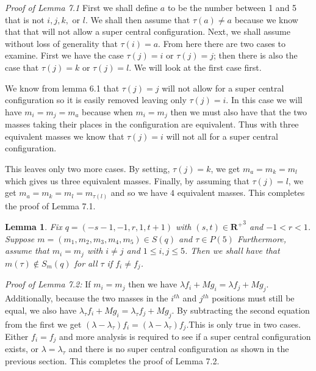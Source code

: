 \documentclass[11pt,leqno]{article}
\newtheorem{lemma}[theorem]{Lemma}
\theoremstyle{definition}
\theoremstyle{remark}
\numberwithin{equation}{section}
\begin{document}
\textit{Proof of Lemma 7.1}
First we shall define $a$ to be the number between 1 and 5 that is not $i,j,k,$ or $l$. We shall then assume that $\tau(a)\neq a$ because we know that that will not allow a super central configuration. Next, we shall assume without loss of generality that $\tau(i)=a$. From here there are two cases to examine. First we have the case $\tau(j)=i$ or $\tau(j)=j$; then there is also the case that $\tau(j)=k$ or $\tau(j)=l$. We will look at the first case first. 

We know from lemma 6.1 that $\tau(j)=j$ will not allow for a super central configuration so it is easily removed leaving only $\tau(j)=i$. In this case we will have $m_i=m_j=m_a$ because when $m_i=m_j$ then we must also have that the two masses taking their places in the configuration are equivalent. Thus with three equivalent masses we know that $\tau(j)=i$ will not all for a super central configuration.

This leaves only two more cases. By setting, $\tau(j)=k$, we get $m_a=m_k=m_l$ which gives us three equivalent masses. Finally, by assuming that $\tau(j)=l$, we get $m_a=m_k=m_l=m_{\tau(l)}$ and so we have $4$ equivalent masses. This completes the proof of Lemma 7.1.

\begin{lemma}
Fix $q=(-s-1, -1, r, 1, t+1)$ with $(s,t)\in \mathbf{R^+}^3$ and $-1<r<1$. Suppose $m=(m_1, m_2, m_3, m_4, m_5)\in S(q)$ and $\tau \in P(5)$ Furthermore, assume that $m_i=m_j$ with $i\neq j$ and $1\leq i,j \leq 5$. Then we shall have that $m(\tau) \notin S_m(q)$ for all $\tau$ if $f_i \neq f_j$.
\end{lemma}

\textit{Proof of Lemma 7.2:}
If $m_i=m_j$ then we have $\lambda f_i +Mg_i=\lambda f_j+Mg_j$. Additionally, because the two masses in the $i^{th}$ and $j^{th}$ positions must still be equal, we also have $\lambda_{\tau} f_i +Mg_i=\lambda_{\tau} f_j+Mg_j$. By subtracting the second equation from the first we get $(\lambda-\lambda_{\tau})f_i=(\lambda-\lambda_{\tau})f_j$.This is only true in two cases. Either $f_i=f_j$ and more analysis is required to see if a super central configuration exists, or $\lambda=\lambda_{\tau}$ and there is no super central configuration as shown in the previous section. This completes the proof of Lemma 7.2.
\end{document}
